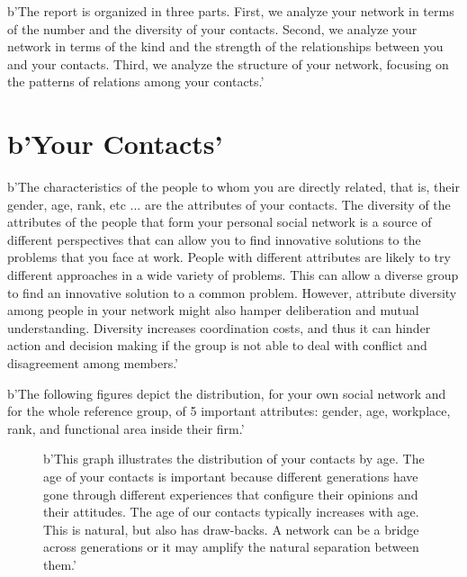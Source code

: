 \documentclass[a4paper,12pt]{article}
\begin{document}
b'The report is organized in three parts. First, we analyze your network in terms of the number and the diversity of your contacts. Second, we analyze your network in terms of the kind and the strength of the relationships between you and your contacts. Third, we analyze the structure of your network, focusing on the patterns of relations among your contacts.'


\newpage


\section*{b'Your Contacts'}


b'The characteristics of the people to whom you are directly related, that is, their gender, age, rank, etc ... are the attributes of your contacts. The diversity of the attributes of the people that form your personal social network is a source of different perspectives that can allow you to find innovative solutions to the problems that you face at work. People with different attributes are likely to try different approaches in a wide variety of problems. This can allow a diverse group to find an innovative solution to a common problem. However, attribute diversity among people in your network might also hamper deliberation and mutual understanding. Diversity increases coordination costs, and thus it can hinder action and decision making if the group is not able to deal with conflict and disagreement among members.'

b'The following figures depict the distribution, for your own social network and for the whole reference group, of 5 important attributes: gender, age, workplace, rank, and functional area inside their firm.'


\begin{figure}[H]
\centering
{}
\hspace{.01in}
\caption{b'This graph illustrates the distribution of your contacts by age. The age of your contacts is important because different generations have gone through different experiences that configure their opinions and their attitudes. The age of our contacts typically increases with age. This is natural, but also has draw-backs. A network can be a bridge across generations or it may amplify the natural separation between them.'}
\end{figure}
\end{document}
